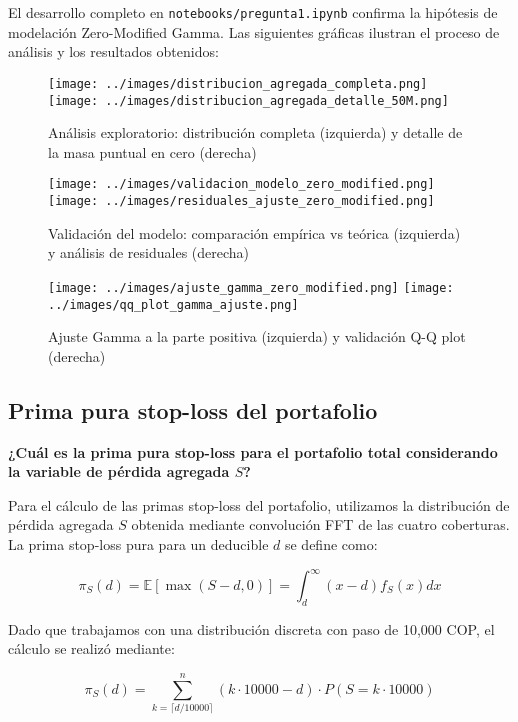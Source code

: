 El desarrollo completo en \texttt{notebooks/pregunta1.ipynb} confirma la hipótesis de modelación Zero-Modified Gamma. Las siguientes gráficas ilustran el proceso de análisis y los resultados obtenidos:

\begin{figure}[H]
\centering
\texttt{[image: ../images/distribucion\_agregada\_completa.png]}
\texttt{[image: ../images/distribucion\_agregada\_detalle\_50M.png]}
\caption{Análisis exploratorio: distribución completa (izquierda) y detalle de la masa puntual en cero (derecha)}
\end{figure}

\begin{figure}[H]
    \centering
    \texttt{[image: ../images/validacion\_modelo\_zero\_modified.png]}
    \texttt{[image: ../images/residuales\_ajuste\_zero\_modified.png]}
    \caption{Validación del modelo: comparación empírica vs teórica (izquierda) y análisis de residuales (derecha)}
\end{figure}

\begin{figure}[H]
\centering
\texttt{[image: ../images/ajuste\_gamma\_zero\_modified.png]}
\texttt{[image: ../images/qq\_plot\_gamma\_ajuste.png]}
\caption{Ajuste Gamma a la parte positiva (izquierda) y validación Q-Q plot (derecha)}
\end{figure}

\subsection{Prima pura stop-loss del portafolio}

\textbf{¿Cuál es la prima pura stop-loss para el portafolio total considerando la variable de pérdida agregada $S$?}

Para el cálculo de las primas stop-loss del portafolio, utilizamos la distribución de pérdida agregada $S$ obtenida mediante convolución FFT de las cuatro coberturas. La prima stop-loss pura para un deducible $d$ se define como:

$$\pi_S(d) = \mathbb{E}[\max(S - d, 0)] = \int_d^{\infty} (x - d) f_S(x) dx$$

Dado que trabajamos con una distribución discreta con paso de 10,000 COP, el cálculo se realizó mediante:

$$\pi_S(d) = \sum_{k=\lceil d/10000 \rceil}^{n} (k \cdot 10000 - d) \cdot P(S = k \cdot 10000)$$

